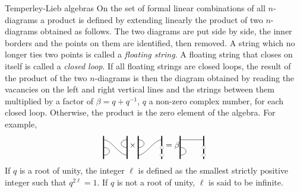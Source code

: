 \documentclass[reqno]{amsart}
\newcommand{\vac}[1]{\draw (#1) circle (1/5);
 	\fill[white] (#1) circle (1/5)}
\begin{document}
\begin{section}{Temperley-Lieb algebras}
On the set of formal linear combinations of all $n$-diagrams a product is defined by extending linearly the product of two $n$-diagrams obtained as follows. The two diagrams are put side by side, the inner borders and the points on them are identified, then removed. A string which no longer ties two points is called a \emph{floating string}. A floating string that closes on itself is called a \emph{closed loop}. If all floating strings are closed loops, the result of the product of the two $n$-diagrams is then the diagram obtained by reading the vacancies on the left and right vertical lines and the strings between them multiplied by a factor of $\beta = q+q^{-1}$, $q$ a non-zero complex number, for each closed loop. Otherwise, the product is the zero element of the algebra. For example, 
\begin{equation*}
	\begin{tikzpicture}[baseline={(current bounding box.center)},scale=1/3]
		\draw[very thick] (0,-1/2) -- (0,5/2);
		\draw[very thick] (3,-1/2) -- (3,5/2);
			\draw (0,0) .. controls (1,0) and (1,1) .. (0,1);
			\draw (0,2) .. controls (1,2) and (2,0) .. (3,0);
			\draw (3,1) .. controls (2,1) and (2,2) .. (3,2);
	\end{tikzpicture} \times
	\begin{tikzpicture}[baseline={(current bounding box.center)},scale=1/3]
		\draw[very thick] (0,-1/2) -- (0,5/2);
		\draw[very thick] (3,-1/2) -- (3,5/2);
			\draw (0,0) .. controls (1,0) and (2,2) .. (3,2);
			\draw (0,2) .. controls (1,2) and (1,1) .. (0,1);
				\vac{3,0};
				\vac{3,1};
	\end{tikzpicture} = \beta
	\begin{tikzpicture}[baseline={(current bounding box.center)},scale=1/3]
		\draw[very thick] (0,-1/2) -- (0,5/2);
		\draw[very thick] (3,-1/2) -- (3,5/2);
			\draw (0,0) .. controls (1,0) and (1,1) .. (0,1);
			\draw (0,2) -- (3,2);
				\vac{3,0};
				\vac{3,1};
	\end{tikzpicture}  
\end{equation*}
If $q$ is a root of unity, the integer $\ell $ is defined as the smallest strictly positive integer such that $q^{2\ell}=1$. If $q$ is not a root of unity, $\ell $ is said to be infinite.


\end{section}
\end{document}
